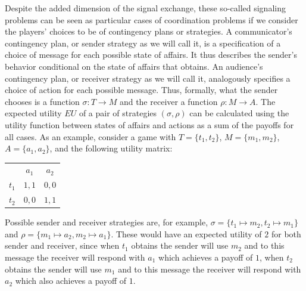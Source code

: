 \documentclass[a4paper]{article}
\begin{document}
Despite the added dimension of the signal exchange, these so-called signaling problems can be seen as particular cases of coordination problems if we consider the players' choices to be of contingency plans or strategies.
A communicator's contingency plan, or sender strategy as we will call it, is a specification of a choice of message for each possible state of affairs.
It thus describes the sender's behavior conditional on the state of affairs that obtains.
An audience's contingency plan, or receiver strategy as we will call it, analogously specifies a choice of action for each possible message.
Thus, formally, what the sender chooses is a function $\sigma : T \rightarrow M$ and the receiver a function $\rho : M \rightarrow A$.
The expected utility $EU$ of a pair of strategies $(\sigma,\rho)$ can be calculated using the utility function between states of affairs and actions as a sum of the payoffs for all cases. %
As an example, consider a game with $T = \lbrace t_1, t_2 \rbrace$, $M = \lbrace m_1, m_2 \rbrace$, $A = \lbrace a_1, a_2 \rbrace$, and the following utility matrix:
\begin{center}
\begin{tabular}{r|c|c|}
\multicolumn{1}{r}{}
 & \multicolumn{1}{c}{$a_1$}
 & \multicolumn{1}{c}{$a_2$} \\ \cline{2-3}
   $t_1$ & $1,1$ & $0,0$ \\ \cline{2-3}
   $t_2$ & $0,0$ & $1,1$ \\ \cline{2-3}
\end{tabular}
\end{center}
Possible sender and receiver strategies are, for example, $\sigma = \lbrace t_1 \mapsto m_2, t_2 \mapsto m_1 \rbrace$ and $\rho = \lbrace m_1 \mapsto a_2, m_2 \mapsto a_1 \rbrace$.
These would have an expected utility of $2$ for both sender and receiver, since when $t_1$ obtains the sender will use $m_2$ and to this message the receiver will respond with $a_1$ which achieves a payoff of $1$, when $t_2$ obtains the sender will use $m_1$ and to this message the receiver will respond with $a_2$ which also achieves a payoff of $1$.
\end{document}

